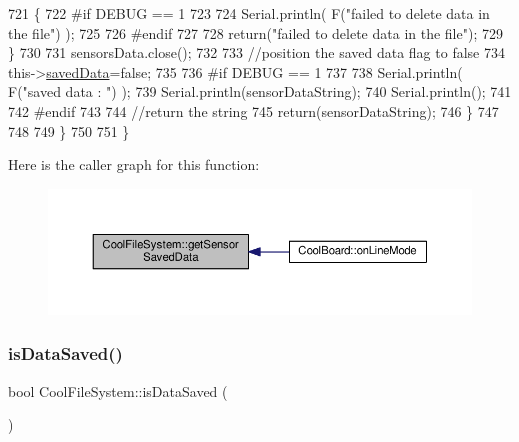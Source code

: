 \begin{DoxyCode}
721             \{
722 \textcolor{preprocessor}{            #if DEBUG == 1}
723         
724                 Serial.println( F(\textcolor{stringliteral}{"failed to delete data in the file"}) );
725         
726 \textcolor{preprocessor}{            #endif}
727 
728                 \textcolor{keywordflow}{return}(\textcolor{stringliteral}{"failed to delete data in the file"});
729             \}
730 
731             sensorsData.close();
732             
733             \textcolor{comment}{//position the saved data flag to false}
734             this->\hyperlink{classCoolFileSystem_ad398e0c5c41a0c88acdf5d672aa71351}{savedData}=\textcolor{keyword}{false}; 
735             
736 \textcolor{preprocessor}{        #if DEBUG == 1 }
737 
738             Serial.println( F(\textcolor{stringliteral}{"saved data : "}) );
739             Serial.println(sensorDataString);
740             Serial.println();
741         
742 \textcolor{preprocessor}{        #endif}
743 
744             \textcolor{comment}{//return the string}
745             \textcolor{keywordflow}{return}(sensorDataString);       
746         \}
747         
748         
749     \}
750 
751 \}
\end{DoxyCode}
Here is the caller graph for this function\+:\nopagebreak
\begin{figure}[H]
\begin{center}
\leavevmode
\includegraphics[width=350pt]{classCoolFileSystem_a5c58bca3735c0ed3efb268d70ef998ef_icgraph}
\end{center}
\end{figure}
\mbox{\label{classCoolFileSystem_a5a7eaeea7a9fbf8aaef651d862fa3b5b}} 
\subsubsection{\texorpdfstring{is\+Data\+Saved()}{isDataSaved()}}
{\footnotesize\ttfamily bool Cool\+File\+System\+::is\+Data\+Saved (\begin{DoxyParamCaption}{ }\end{DoxyParamCaption})}

